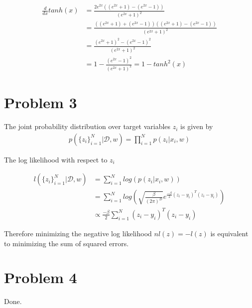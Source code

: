 \documentclass[12pt]{article}
\begin{document}
\begin{equation}
 \begin{align}
  \frac{d}{dx} tanh(x) &= \frac{2 e^{2x} \left( (e^{2x} + 1) - (e^{2x} - 1) \right)}{(e^{2x} + 1)^2} \\
  &= \frac{\left( (e^{2x} + 1) + (e^{2x} - 1) \right) \left( (e^{2x} + 1) - (e^{2x} - 1) \right)}{(e^{2x} + 1)^2} \\
  &=  \frac{(e^{2x} + 1)^2 - (e^{2x} - 1)^2}{(e^{2x} + 1)^2} \\
  &= 1 - \frac{(e^{2x} - 1)^2}{(e^{2x} + 1)^2} = 1 - tanh^2(x)
 \end{align}
\end{equation}


\section*{Problem 3}

The joint probability distribution over target variables $z_i$ is given by
\begin{equation}
 \begin{align}
  p(\{z_i\}_{i=1}^N | \mathcal{D}, w) = \prod_{i=1}^N  p(z_i | x_i, w)
 \end{align}
\end{equation}

The log likelihood with respect to $z_i$ 

\begin{equation}
 \begin{align}
  l(\{z_i\}_{i=1}^N | \mathcal{D}, w) &= \sum_{i=1}^N  log \left( p(z_i | x_i, w) \right) \\
  &= \sum_{i=1}^N log{\left(\sqrt{\frac{\beta}{(2 \pi)^D}} e^{\frac{-\beta}{2} (z_i - y_i)^T (z_i - y_i)} \right) } \\
  &\propto \frac{-\beta}{2} \sum_{i=1}^N (z_i - y_i)^T (z_i - y_i)
 \end{align}
\end{equation}

Therefore minimizing the negative log likelihood $nl(z) = -l(z)$ is equivalent to minimizing the sum of squared errors.

\section*{Problem 4}
Done.
\end{document}
